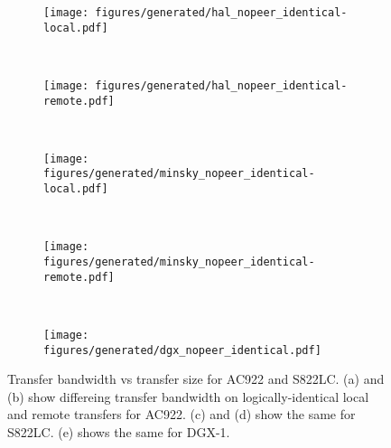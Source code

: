 \begin{figure}[ht]
    \centering
    \begin{subfigure}[b]{0.4\textwidth}
        \texttt{[image: figures/generated/hal\_nopeer\_identical-local.pdf]}
        \caption{}
        \label{fig:explicit-nopeer-identical-ac922-local}
    \end{subfigure}
    ~
    \begin{subfigure}[b]{0.4\textwidth}
        \texttt{[image: figures/generated/hal\_nopeer\_identical-remote.pdf]}
        \caption{}
        \label{fig:explicit-nopeer-identical-ac922-remote}
    \end{subfigure}
    \\
    \begin{subfigure}[b]{0.4\textwidth}
        \texttt{[image: figures/generated/minsky\_nopeer\_identical-local.pdf]}
        \caption{}
        \label{fig:explicit-nopeer-identical-s822lc-local}
    \end{subfigure}
    ~
    \begin{subfigure}[b]{0.4\textwidth}
        \texttt{[image: figures/generated/minsky\_nopeer\_identical-remote.pdf]}
        \caption{}
        \label{fig:explicit-nopeer-identical-s822lc-remote}
    \end{subfigure}
    \\
    \begin{subfigure}[b]{0.4\textwidth}
        \texttt{[image: figures/generated/dgx\_nopeer\_identical.pdf]}
        \caption{}
        \label{fig:explicit-nopeer-identical-dgx}
    \end{subfigure}
    \caption[]{
        Transfer bandwidth vs transfer size for AC922 and S822LC.
        (a) and (b) show differeing transfer bandwidth on logically-identical local and remote transfers for AC922.
        (c) and (d) show the same for S822LC.
        (e) shows the same for DGX-1.
    }
    \label{fig:explicit-nopeer-identical}
\end{figure}

